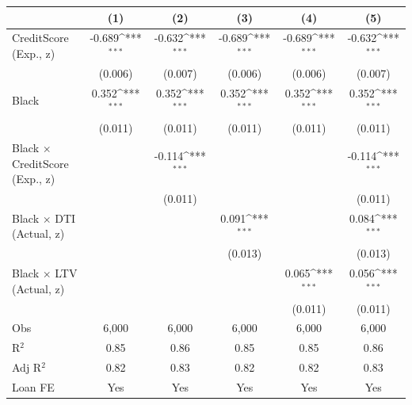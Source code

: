 {
\def\sym#1{\ifmmode^{#1}\else\(^{#1}\)\fi}
\begin{tabular}{l*{5}{c}}
\toprule
                &\multicolumn{1}{c}{(1)}         &\multicolumn{1}{c}{(2)}         &\multicolumn{1}{c}{(3)}         &\multicolumn{1}{c}{(4)}         &\multicolumn{1}{c}{(5)}         \\
\midrule
CreditScore (Exp., z)&   -0.689\sym{***}&   -0.632\sym{***}&   -0.689\sym{***}&   -0.689\sym{***}&   -0.632\sym{***}\\
                &  (0.006)         &  (0.007)         &  (0.006)         &  (0.006)         &  (0.007)         \\
Black           &    0.352\sym{***}&    0.352\sym{***}&    0.352\sym{***}&    0.352\sym{***}&    0.352\sym{***}\\
                &  (0.011)         &  (0.011)         &  (0.011)         &  (0.011)         &  (0.011)         \\
Black $\times$ CreditScore (Exp., z)&                  &   -0.114\sym{***}&                  &                  &   -0.114\sym{***}\\
                &                  &  (0.011)         &                  &                  &  (0.011)         \\
Black $\times$ DTI (Actual, z)&                  &                  &    0.091\sym{***}&                  &    0.084\sym{***}\\
                &                  &                  &  (0.013)         &                  &  (0.013)         \\
Black $\times$ LTV (Actual, z)&                  &                  &                  &    0.065\sym{***}&    0.056\sym{***}\\
                &                  &                  &                  &  (0.011)         &  (0.011)         \\
\midrule
Obs             &    6,000         &    6,000         &    6,000         &    6,000         &    6,000         \\
R$^2$           &     0.85         &     0.86         &     0.85         &     0.85         &     0.86         \\
Adj R$^2$       &     0.82         &     0.83         &     0.82         &     0.82         &     0.83         \\
Loan FE         &      Yes         &      Yes         &      Yes         &      Yes         &      Yes         \\
\bottomrule
\end{tabular}
}
